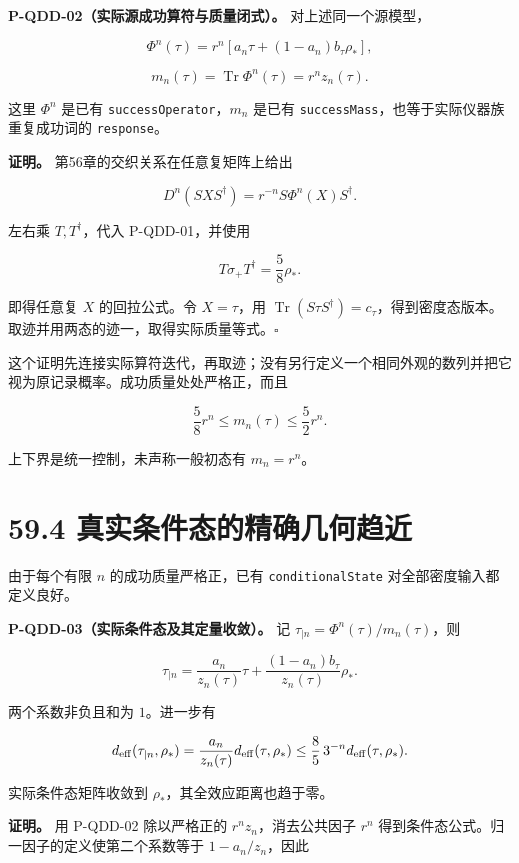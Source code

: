 \documentclass[
  11pt,
  oneside]{book}
\begin{document}
\protect\hypertarget{p-qdd-02}{}{}

\textbf{P-QDD-02（实际源成功算符与质量闭式）。} 对上述同一个源模型，

\[
\Phi^n(\tau)
=r^n\left[a_n\tau+(1-a_n)b_\tau\rho_*\right],
\]

\[
m_n(\tau)=\operatorname{Tr}\Phi^n(\tau)
=r^nz_n(\tau).
\]

这里 \(\Phi^n\) 是已有 \texttt{success\allowbreak Operator}，\(m_n\) 是已有
\texttt{success\allowbreak Mass}，也等于实际仪器族重复成功词的 \texttt{response}。

\textbf{证明。} 第56章的交织关系在任意复矩阵上给出

\[
D^n(SXS^\dagger)=r^{-n}S\Phi^n(X)S^\dagger.
\]

左右乘 \(T,T^\dagger\)，代入 P-QDD-01，并使用

\[
T\sigma_+T^\dagger=\frac58\rho_*.
\]

即得任意复 \(X\) 的回拉公式。令 \(X=\tau\)，用
\(\operatorname{Tr}(S\tau S^\dagger)=c_\tau\)，得到密度态版本。取迹并用两态的迹一，取得实际质量等式。\(\square\)

这个证明先连接实际算符迭代，再取迹；没有另行定义一个相同外观的数列并把它视为原记录概率。成功质量处处严格正，而且

\[
\frac58r^n\le m_n(\tau)\le\frac52r^n.
\]

上下界是统一控制，未声称一般初态有 \(m_n=r^n\)。

\section{59.4 真实条件态的精确几何趋近}

由于每个有限 \(n\) 的成功质量严格正，已有 \texttt{conditional\allowbreak State}
对全部密度输入都定义良好。

\protect\hypertarget{p-qdd-03}{}{}

\textbf{P-QDD-03（实际条件态及其定量收敛）。} 记
\(\tau_{\mid n}=\Phi^n(\tau)/m_n(\tau)\)，则

\[
\tau_{\mid n}
=\frac{a_n}{z_n(\tau)}\tau
+\frac{(1-a_n)b_\tau}{z_n(\tau)}\rho_*.
\]

两个系数非负且和为 \(1\)。进一步有

\[
d_{\rm eff}(\tau_{\mid n},\rho_*)
=\frac{a_n}{z_n(\tau)}d_{\rm eff}(\tau,\rho_*)
\le\frac85\,3^{-n}d_{\rm eff}(\tau,\rho_*).
\]

实际条件态矩阵收敛到 \(\rho_*\)，其全效应距离也趋于零。

\textbf{证明。} 用 P-QDD-02 除以严格正的 \(r^nz_n\)，消去公共因子
\(r^n\) 得到条件态公式。归一因子的定义使第二个系数等于
\(1-a_n/z_n\)，因此
\end{document}
